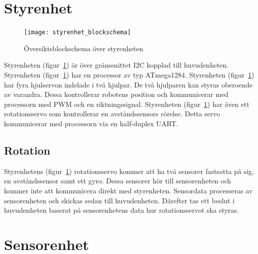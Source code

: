 \documentclass{article}
\begin{document}
\section{Styrenhet}
\begin{figure}[H]
\centering
\texttt{[image: styrenhet\_blockschema]}
\caption{Översiktsblockschema över styrenheten}
\label{fig:styrenhet}
\end{figure}
Styrenheten (figur~\ref{fig:styrenhet}) är över gränssnittet I2C kopplad till huvudenheten.\newline\newline
Styrenheten (figur~\ref{fig:styrenhet}) har en processor av typ ATmega1284.\newline\newline
Styrenheten (figur~\ref{fig:styrenhet}) har fyra hjulservon indelade i två hjulpar. De två hjulparen kan styras oberoende av varandra. Dessa kontrollerar robotens position och kommunicerar med processorn med PWM och en riktningssignal.\newline\newline
Styrenheten (figur~\ref{fig:styrenhet}) har även ett rotationsservo som kontrollerar en avståndssensors rörelse. Detta servo kommunicerar med processorn via en half-duplex UART.\newline\newline

\subsection{Rotation}
Styrenhetens (figur~\ref{fig:styrenhet}) rotationsservo kommer att ha två sensorer fastsatta på sig, en avståndssensor samt ett gyro. Dessa sensorer hör till sensorenheten och kommer inte att kommunicera direkt med styrenheten. Sensordata processeras av sensorenheten och skickas sedan till huvudenheten. Därefter tas ett beslut i huvudenheten baserat på sensorenhetens data hur rotationsservot ska styras. 


\section{Sensorenhet}
\end{document}
